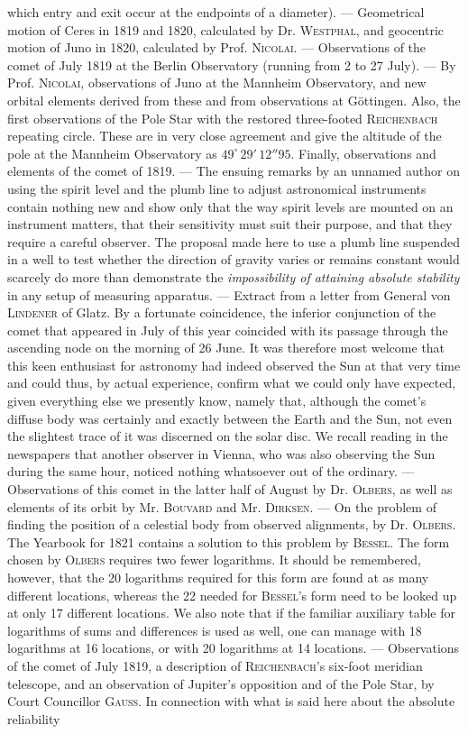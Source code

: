 which entry and exit occur at the endpoints of a diameter). --- Geometrical motion of Ceres in 1819 and 1820, calculated by Dr. \textsc{Westphal}, and geocentric motion of Juno in 1820, calculated by Prof. \textsc{Nicolai}. --- Observations of the comet of July 1819 at the Berlin Observatory (running from 2 to 27 July). --- By Prof. \textsc{Nicolai}, observations of Juno at the Mannheim Observatory, and new orbital elements derived from these and from observations at Göttingen. Also, the first observations of the Pole Star with the restored three-footed \textsc{Reichenbach} repeating circle. These are in very close agreement and give the altitude of the pole at the Mannheim Observatory as $49^\circ\,29'\,12''95$. Finally, observations and elements of the comet of 1819. --- The ensuing remarks by an unnamed author on using the spirit level and the plumb line to adjust astronomical instruments contain nothing new and show only that the way spirit levels are mounted on an instrument matters, that their sensitivity must suit their purpose, and that they require a careful observer. The proposal made here to use a plumb line suspended in a well to test whether the direction of gravity varies or remains constant would scarcely do more than demonstrate the \emph{impossibility of attaining absolute stability} in any setup of measuring apparatus. --- Extract from a letter from General von \textsc{Lindener} of Glatz. By a fortunate coincidence, the inferior conjunction of the comet that appeared in July of this year coincided with its passage through the ascending node on the morning of 26 June. It was therefore most welcome that this keen enthusiast for astronomy had indeed observed the Sun at that very time and could thus, by actual experience,  confirm what we could only have expected, given everything else we presently know, namely that, although the comet's diffuse body was certainly and exactly between the Earth and the Sun, not even the slightest trace of it was discerned on the solar disc. We recall reading in the newspapers that another observer in Vienna, who was also observing the Sun during the same hour, noticed nothing whatsoever out of the ordinary. --- Observations of this comet in the latter half of August by Dr. \textsc{Olbers}, as well as elements of its orbit by Mr. \textsc{Bouvard} and Mr. \textsc{Dirksen}. --- On the problem of finding the position of a celestial body from observed alignments, by Dr. \textsc{Olbers}. The Yearbook for 1821 contains a solution to this problem by \textsc{Bessel}. The form chosen by \textsc{Olbers} requires two fewer logarithms. It should be remembered, however, that the 20 logarithms required for this form are found at as many different locations, whereas the 22 needed for \textsc{Bessel}'s form need to be looked up at only 17 different locations. We also note that if the familiar auxiliary table for logarithms of sums and differences is used as well, one can manage with 18 logarithms at 16 locations, or with 20 logarithms at 14 locations. --- Observations of the comet of July 1819, a description of \textsc{Reichenbach}'s six-foot meridian telescope, and an observation of Jupiter's opposition and of the Pole Star, by Court Councillor \textsc{Gauss}. In connection with what is said here about the absolute reliability 